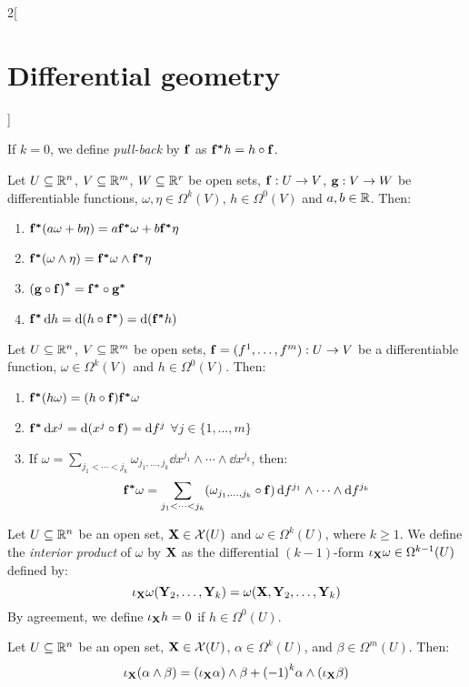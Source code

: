 \documentclass[../../../main.tex]{subfiles}
\begin{document}
\begin{multicols}{2}[\section{Differential geometry}]
\begin{definition}
    If $k=0$, we define \emph{pull-back} by $\boldsymbol{\mathrm{f}}$ as $\boldsymbol{\mathrm{f^*}}h=h\circ\boldsymbol{\mathrm{f}}$.
  \end{definition}
  \begin{proposition}
    Let $U\subseteq\mathbb{R}^n$, $V\subseteq\mathbb{R}^m$, $W\subseteq\mathbb{R}^r$ be open sets, $\boldsymbol{\mathrm{f}}:U\rightarrow V$, $\boldsymbol{\mathrm{g}}:V\rightarrow W$ be differentiable functions, $\omega,\eta\in\Omega^k(V)$, $h\in\Omega^0(V)$ and $a,b\in\mathbb{R}$. Then:
    \begin{enumerate}
      \item $\boldsymbol{\mathrm{f^*}}(a\omega+b\eta)=a\boldsymbol{\mathrm{f^*}}\omega+b\boldsymbol{\mathrm{f^*}}\eta$
      \item $\boldsymbol{\mathrm{f^*}}(\omega\wedge\eta)=\boldsymbol{\mathrm{f^*}}\omega\wedge \boldsymbol{\mathrm{f^*}}\eta$
      \item ${(\boldsymbol{\mathrm{g}}\circ \boldsymbol{\mathrm{f}})}^{\boldsymbol{\mathrm{*}}}=\boldsymbol{\mathrm{f^*}}\circ \boldsymbol{\mathrm{g^*}}$
      \item $\boldsymbol{\mathrm{f^*}}\dd{h}=\dd{(h\circ \boldsymbol{\mathrm{f^*}})}=\dd{(\boldsymbol{\mathrm{f^*}}h)}$
    \end{enumerate}
  \end{proposition}
  \begin{corollary}
    Let $U\subseteq\mathbb{R}^n$, $V\subseteq\mathbb{R}^m$ be open sets, $\boldsymbol{\mathrm{f}}=(f^1,\ldots,f^m):U\rightarrow V$ be a differentiable function, $\omega\in\Omega^k(V)$ and $h\in\Omega^0(V)$. Then:
    \begin{enumerate}
      \item $\boldsymbol{\mathrm{f^*}}(h\omega)=(h\circ \boldsymbol{\mathrm{f}})\boldsymbol{\mathrm{f^*}}\omega$
      \item $\boldsymbol{\mathrm{f^*}}\dd{x^j}=\dd{(x^j\circ \boldsymbol{\mathrm{f}})}=\dd{f^j}$ $\forall j\in\{1,\ldots,m\}$
      \item If $\omega=\sum_{j_1<\cdots<j_k}\omega_{j_1,\ldots,j_k}\dd{x^{j_1}}\wedge\cdots\wedge\dd{x^{j_k}}$, then: $$\boldsymbol{\mathrm{f^*}}\omega=\sum_{j_1<\cdots<j_k}(\omega_{j_1,\ldots,j_k}\circ \boldsymbol{\mathrm{f}})\dd{f^{j_1}}\wedge\cdots\wedge\dd{f^{j_k}}$$
    \end{enumerate}
  \end{corollary}
  \begin{definition}
    Let $U\subseteq\mathbb{R}^n$ be an open set, $\boldsymbol{\mathrm{X}}\in\mathcal{X}(U)$ and $\omega\in\Omega^k(U)$, where $k\geq 1$.
    We define the \emph{interior product} of $\omega$ by $\boldsymbol{\mathrm{X}}$ as the differential $(k-1)$-form $\iota_{\boldsymbol{\mathrm{X}}}\omega\in\Omega^{k-1}(U)$ defined by:
    $$\iota_{\boldsymbol{\mathrm{X}}}\omega(\boldsymbol{\mathrm{Y}}_2,\ldots,\boldsymbol{\mathrm{Y}}_k)=\omega(\boldsymbol{\mathrm{X}},\boldsymbol{\mathrm{Y}}_2,\ldots,\boldsymbol{\mathrm{Y}}_k)$$
    By agreement, we define $\iota_{\boldsymbol{\mathrm{X}}}h=0$ if $h\in\Omega^0(U)$.
  \end{definition}
  \begin{proposition}
    Let $U\subseteq\mathbb{R}^n$ be an open set, $\boldsymbol{\mathrm{X}}\in\mathcal{X}(U)$, $\alpha\in\Omega^k(U)$, and $\beta\in\Omega^m(U)$. Then: $$\iota_{\boldsymbol{\mathrm{X}}}(\alpha\wedge\beta)=(\iota_{\boldsymbol{\mathrm{X}}}\alpha)\wedge\beta+{(-1)}^k\alpha\wedge(\iota_{\boldsymbol{\mathrm{X}}}\beta)$$

\end{proposition}
\end{multicols}
\end{document}
